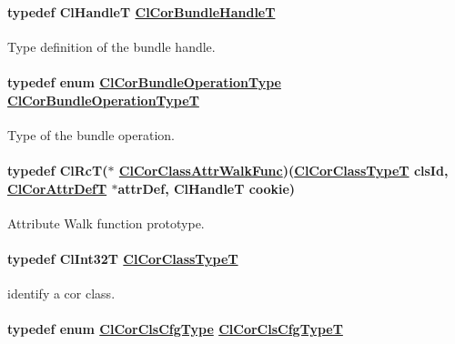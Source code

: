 \hypertarget{group__group13_ga7}{
\paragraph[ClCorBundleHandleT]{\setlength{\rightskip}{0pt plus 5cm}typedef Cl\-Handle\-T \hyperlink{group__group13_ga7}{Cl\-Cor\-Bundle\-Handle\-T}}\hfill}
\label{group__group13_ga7}


Type definition of the bundle handle. \hypertarget{group__group13_ga20}{
\paragraph[ClCorBundleOperationTypeT]{\setlength{\rightskip}{0pt plus 5cm}typedef enum \hyperlink{group__group13_ga336}{Cl\-Cor\-Bundle\-Operation\-Type} \hyperlink{group__group13_ga20}{Cl\-Cor\-Bundle\-Operation\-Type\-T}}\hfill}
\label{group__group13_ga20}


Type of the bundle operation. \hypertarget{group__group13_ga14}{
\paragraph[ClCorClassAttrWalkFunc]{\setlength{\rightskip}{0pt plus 5cm}typedef Cl\-Rc\-T($\ast$  \hyperlink{group__group13_ga14}{Cl\-Cor\-Class\-Attr\-Walk\-Func})(\hyperlink{group__group13_ga2}{Cl\-Cor\-Class\-Type\-T} cls\-Id, \hyperlink{struct_cl_cor_attr_def}{Cl\-Cor\-Attr\-Def\-T} $\ast$attr\-Def, Cl\-Handle\-T cookie)}\hfill}
\label{group__group13_ga14}


Attribute Walk function prototype. \hypertarget{group__group13_ga2}{
\paragraph[ClCorClassTypeT]{\setlength{\rightskip}{0pt plus 5cm}typedef Cl\-Int32T \hyperlink{group__group13_ga2}{Cl\-Cor\-Class\-Type\-T}}\hfill}
\label{group__group13_ga2}


identify a cor class. \hypertarget{group__group13_ga61}{
\paragraph[ClCorClsCfgTypeT]{\setlength{\rightskip}{0pt plus 5cm}typedef enum \hyperlink{group__group13_ga341}{Cl\-Cor\-Cls\-Cfg\-Type}  \hyperlink{group__group13_ga61}{Cl\-Cor\-Cls\-Cfg\-Type\-T}}\hfill}
\label{group__group13_ga61}


